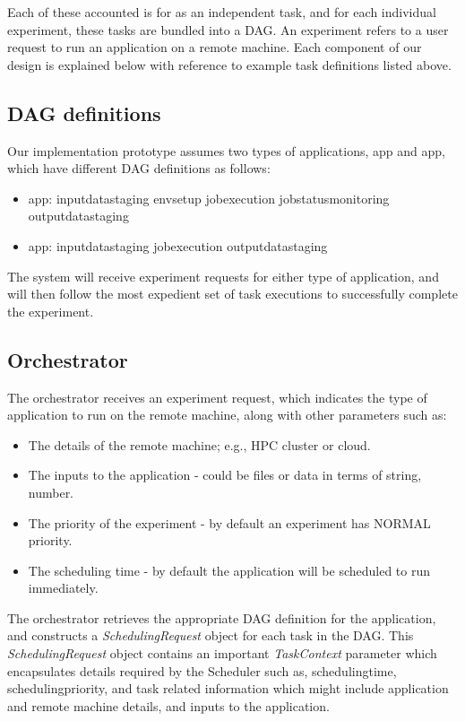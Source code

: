 \documentclass[sigconf]{acmart}
\begin{document}
Each of these accounted is for as an independent task, and for each individual experiment, these tasks are bundled into a DAG. An experiment refers to a user request to run an application on a remote machine. Each component of our design is explained below with reference to example task definitions listed above.

\subsection{DAG definitions}
Our implementation prototype assumes two types of applications, app and app, which have different DAG definitions as follows:
\begin{itemize}
\item app: input\textunderscore datastaging \textrightarrow env\textunderscore setup  \textrightarrow job\textunderscore execution  \textrightarrow job\textunderscore status\textunderscore monitoring  \textrightarrow output\textunderscore datastaging
\item app: input\textunderscore datastaging  \textrightarrow job\textunderscore execution  \textrightarrow output\textunderscore datastaging
\end{itemize}

The system will receive experiment requests for either type of application, and will then follow the most expedient set of task executions to successfully complete the experiment.

\subsection{Orchestrator}
The orchestrator receives an experiment request, which indicates the type of application to run on the remote machine, along with other parameters such as:
\begin{itemize}
\item The details of the remote machine; e.g., HPC cluster or cloud.
\item The inputs to the application - could be files or data in terms of string, number.
\item The priority of the experiment - by default an experiment has NORMAL priority.
\item The scheduling time - by default the application will be scheduled to run immediately.
\end{itemize}

The orchestrator retrieves the appropriate DAG definition for the application, and constructs a \textit{SchedulingRequest} object for each task in the DAG. This \textit{SchedulingRequest} object contains an important \textit{TaskContext} parameter which encapsulates details required by the Scheduler such as, scheduling\textunderscore time, scheduling\textunderscore priority, and task related information which might include application and remote machine details, and inputs to the application.
\end{document}
